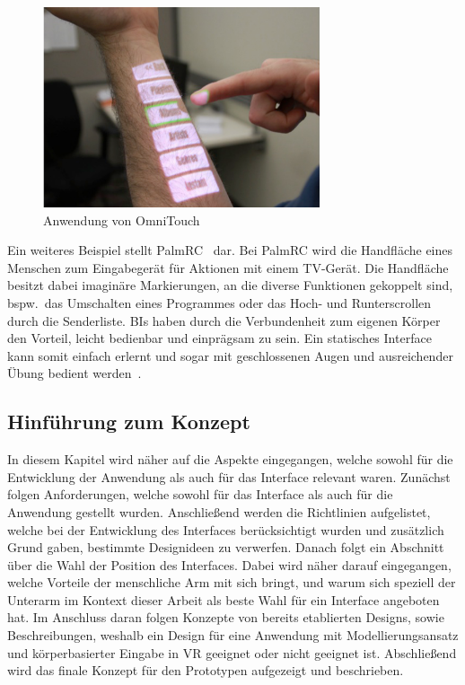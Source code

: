 \begin{figure}[h]
\captionsetup{width=.7\linewidth}
\includegraphics[scale=1]{Bilder/Hauptteil/onbodyinterface}
\centering
\caption{Anwendung von OmniTouch~\cite[p.~446]{omnitouch}}
\label{fig:omnitouch}
\end{figure}

\noindent Ein weiteres Beispiel stellt PalmRC~\cite{palmrc} dar. Bei PalmRC wird die Handfläche eines Menschen zum Eingabegerät für Aktionen mit einem TV-Gerät. Die Handfläche besitzt dabei imaginäre Markierungen, an die diverse Funktionen gekoppelt sind, bspw.~das Umschalten eines Programmes oder das Hoch- und Runterscrollen durch die Senderliste. BIs haben durch die Verbundenheit zum eigenen Körper den Vorteil, leicht bedienbar und einprägsam zu sein. Ein statisches Interface kann somit einfach erlernt und sogar mit geschlossenen Augen und ausreichender Übung bedient werden~\cite{implicationsoflocation}.

\subsection{Hinführung zum Konzept}
In diesem Kapitel wird näher auf die Aspekte eingegangen, welche sowohl für die Entwicklung der Anwendung als auch für das Interface relevant waren. Zunächst folgen Anforderungen, welche sowohl für das Interface als auch für die Anwendung gestellt wurden. Anschließend werden die Richtlinien aufgelistet, welche bei der Entwicklung des Interfaces berücksichtigt wurden und zusätzlich Grund gaben, bestimmte Designideen zu verwerfen. Danach folgt ein Abschnitt über die Wahl der Position des Interfaces. Dabei wird näher darauf eingegangen, welche Vorteile der menschliche Arm mit sich bringt, und warum sich speziell der Unterarm im Kontext dieser Arbeit als beste Wahl für ein Interface angeboten hat. Im Anschluss daran folgen Konzepte von bereits etablierten Designs, sowie Beschreibungen, weshalb ein Design für eine Anwendung mit Modellierungsansatz und körperbasierter Eingabe in VR geeignet oder nicht geeignet ist. Abschließend wird das finale Konzept für den Prototypen aufgezeigt und beschrieben.

